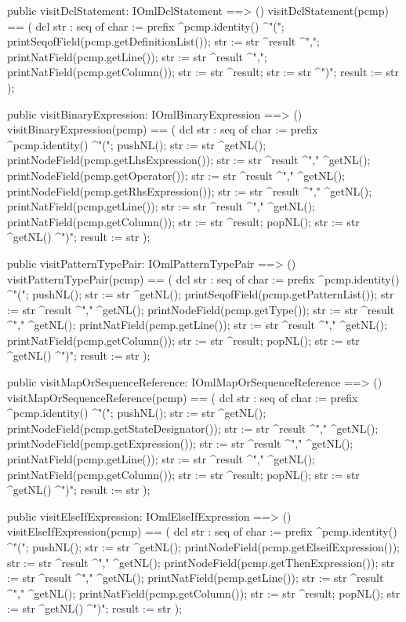 \begin{vdm_al}
  public visitDclStatement: IOmlDclStatement ==> ()
  visitDclStatement(pcmp) ==
    ( dcl str : seq of char := prefix ^pcmp.identity() ^"(";
      printSeqofField(pcmp.getDefinitionList());
      str := str ^result ^",";
      printNatField(pcmp.getLine());
      str := str ^result ^",";
      printNatField(pcmp.getColumn());
      str := str ^result;
      str := str ^")";
      result := str );

  public visitBinaryExpression: IOmlBinaryExpression ==> ()
  visitBinaryExpression(pcmp) ==
    ( dcl str : seq of char := prefix ^pcmp.identity() ^"(";
      pushNL();
      str := str ^getNL();
      printNodeField(pcmp.getLhsExpression());
      str := str ^result ^"," ^getNL();
      printNodeField(pcmp.getOperator());
      str := str ^result ^"," ^getNL();
      printNodeField(pcmp.getRhsExpression());
      str := str ^result ^"," ^getNL();
      printNatField(pcmp.getLine());
      str := str ^result ^"," ^getNL();
      printNatField(pcmp.getColumn());
      str := str ^result;
      popNL();
      str := str ^getNL() ^")";
      result := str );

  public visitPatternTypePair: IOmlPatternTypePair ==> ()
  visitPatternTypePair(pcmp) ==
    ( dcl str : seq of char := prefix ^pcmp.identity() ^"(";
      pushNL();
      str := str ^getNL();
      printSeqofField(pcmp.getPatternList());
      str := str ^result ^"," ^getNL();
      printNodeField(pcmp.getType());
      str := str ^result ^"," ^getNL();
      printNatField(pcmp.getLine());
      str := str ^result ^"," ^getNL();
      printNatField(pcmp.getColumn());
      str := str ^result;
      popNL();
      str := str ^getNL() ^")";
      result := str );

  public visitMapOrSequenceReference: IOmlMapOrSequenceReference ==> ()
  visitMapOrSequenceReference(pcmp) ==
    ( dcl str : seq of char := prefix ^pcmp.identity() ^"(";
      pushNL();
      str := str ^getNL();
      printNodeField(pcmp.getStateDesignator());
      str := str ^result ^"," ^getNL();
      printNodeField(pcmp.getExpression());
      str := str ^result ^"," ^getNL();
      printNatField(pcmp.getLine());
      str := str ^result ^"," ^getNL();
      printNatField(pcmp.getColumn());
      str := str ^result;
      popNL();
      str := str ^getNL() ^")";
      result := str );

  public visitElseIfExpression: IOmlElseIfExpression ==> ()
  visitElseIfExpression(pcmp) ==
    ( dcl str : seq of char := prefix ^pcmp.identity() ^"(";
      pushNL();
      str := str ^getNL();
      printNodeField(pcmp.getElseifExpression());
      str := str ^result ^"," ^getNL();
      printNodeField(pcmp.getThenExpression());
      str := str ^result ^"," ^getNL();
      printNatField(pcmp.getLine());
      str := str ^result ^"," ^getNL();
      printNatField(pcmp.getColumn());
      str := str ^result;
      popNL();
      str := str ^getNL() ^")";
      result := str );


\end{vdm_al}
